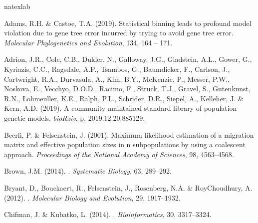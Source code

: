 \documentclass[11pt]{article}
\begin{document}

%  
\begin{thebibliography}{25}
\expandafter\ifx\csname natexlab\endcsname\relax\def\natexlab#1{#1}\fi

Adams, R.H. \& Castoe, T.A. (2019).
\newblock Statistical binning leads to profound model violation due to gene
  tree error incurred by trying to avoid gene tree error.
\newblock \emph{Molecular Phylogenetics and Evolution}, 134, 164 -- 171.

Adrion, J.R., Cole, C.B., Dukler, N., Galloway, J.G., Gladstein, A.L., Gower,
  G., Kyriazis, C.C., Ragsdale, A.P., Tsambos, G., Baumdicker, F., Carlson, J.,
  Cartwright, R.A., Durvasula, A., Kim, B.Y., McKenzie, P., Messer, P.W.,
  Noskova, E., Vecchyo, D.O.D., Racimo, F., Struck, T.J., Gravel, S.,
  Gutenkunst, R.N., Lohmeuller, K.E., Ralph, P.L., Schrider, D.R., Siepel, A.,
  Kelleher, J. \& Kern, A.D. (2019).
\newblock A community-maintained standard library of population genetic models.
\newblock \emph{bioRxiv}, p. 2019.12.20.885129.

Beerli, P. \& Felsenstein, J. (2001).
\newblock Maximum likelihood estimation of a migration matrix and effective
  population sizes in n subpopulations by using a coalescent approach.
\newblock \emph{Proceedings of the National Academy of Sciences}, 98,
  4563--4568.

Brown, J.M. (2014).
.
\newblock \emph{Systematic Biology}, 63, 289--292.

Bryant, D., Bouckaert, R., Felsenstein, J., Rosenberg, N.A. \& RoyChoudhury, A.
  (2012).
.
\newblock \emph{Molecular Biology and Evolution}, 29, 1917--1932.

Chifman, J. \& Kubatko, L. (2014).
.
\newblock \emph{Bioinformatics}, 30, 3317--3324.


\end{thebibliography}
\end{document}
